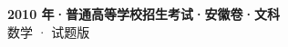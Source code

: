 \documentclass[zihao=-4, a4paper]{ctexart}
\begin{document}
\begin{center}
  {\Large\bfseries 2010 年·普通高等学校招生考试·安徽卷·文科}\\[4pt]
  {\large 数学 · 试题版}
\end{center}
\medskip
{}

\end{document}
